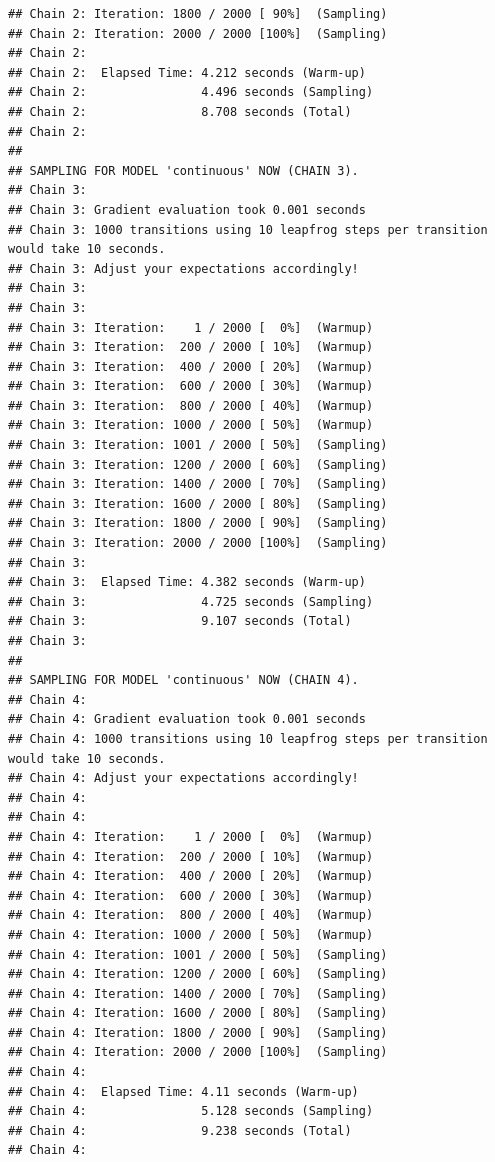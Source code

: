 \documentclass[
]{article}
\begin{document}
\begin{verbatim}
## Chain 2: Iteration: 1800 / 2000 [ 90%]  (Sampling)
## Chain 2: Iteration: 2000 / 2000 [100%]  (Sampling)
## Chain 2: 
## Chain 2:  Elapsed Time: 4.212 seconds (Warm-up)
## Chain 2:                4.496 seconds (Sampling)
## Chain 2:                8.708 seconds (Total)
## Chain 2: 
## 
## SAMPLING FOR MODEL 'continuous' NOW (CHAIN 3).
## Chain 3: 
## Chain 3: Gradient evaluation took 0.001 seconds
## Chain 3: 1000 transitions using 10 leapfrog steps per transition would take 10 seconds.
## Chain 3: Adjust your expectations accordingly!
## Chain 3: 
## Chain 3: 
## Chain 3: Iteration:    1 / 2000 [  0%]  (Warmup)
## Chain 3: Iteration:  200 / 2000 [ 10%]  (Warmup)
## Chain 3: Iteration:  400 / 2000 [ 20%]  (Warmup)
## Chain 3: Iteration:  600 / 2000 [ 30%]  (Warmup)
## Chain 3: Iteration:  800 / 2000 [ 40%]  (Warmup)
## Chain 3: Iteration: 1000 / 2000 [ 50%]  (Warmup)
## Chain 3: Iteration: 1001 / 2000 [ 50%]  (Sampling)
## Chain 3: Iteration: 1200 / 2000 [ 60%]  (Sampling)
## Chain 3: Iteration: 1400 / 2000 [ 70%]  (Sampling)
## Chain 3: Iteration: 1600 / 2000 [ 80%]  (Sampling)
## Chain 3: Iteration: 1800 / 2000 [ 90%]  (Sampling)
## Chain 3: Iteration: 2000 / 2000 [100%]  (Sampling)
## Chain 3: 
## Chain 3:  Elapsed Time: 4.382 seconds (Warm-up)
## Chain 3:                4.725 seconds (Sampling)
## Chain 3:                9.107 seconds (Total)
## Chain 3: 
## 
## SAMPLING FOR MODEL 'continuous' NOW (CHAIN 4).
## Chain 4: 
## Chain 4: Gradient evaluation took 0.001 seconds
## Chain 4: 1000 transitions using 10 leapfrog steps per transition would take 10 seconds.
## Chain 4: Adjust your expectations accordingly!
## Chain 4: 
## Chain 4: 
## Chain 4: Iteration:    1 / 2000 [  0%]  (Warmup)
## Chain 4: Iteration:  200 / 2000 [ 10%]  (Warmup)
## Chain 4: Iteration:  400 / 2000 [ 20%]  (Warmup)
## Chain 4: Iteration:  600 / 2000 [ 30%]  (Warmup)
## Chain 4: Iteration:  800 / 2000 [ 40%]  (Warmup)
## Chain 4: Iteration: 1000 / 2000 [ 50%]  (Warmup)
## Chain 4: Iteration: 1001 / 2000 [ 50%]  (Sampling)
## Chain 4: Iteration: 1200 / 2000 [ 60%]  (Sampling)
## Chain 4: Iteration: 1400 / 2000 [ 70%]  (Sampling)
## Chain 4: Iteration: 1600 / 2000 [ 80%]  (Sampling)
## Chain 4: Iteration: 1800 / 2000 [ 90%]  (Sampling)
## Chain 4: Iteration: 2000 / 2000 [100%]  (Sampling)
## Chain 4: 
## Chain 4:  Elapsed Time: 4.11 seconds (Warm-up)
## Chain 4:                5.128 seconds (Sampling)
## Chain 4:                9.238 seconds (Total)
## Chain 4:
\end{verbatim}
\end{document}
